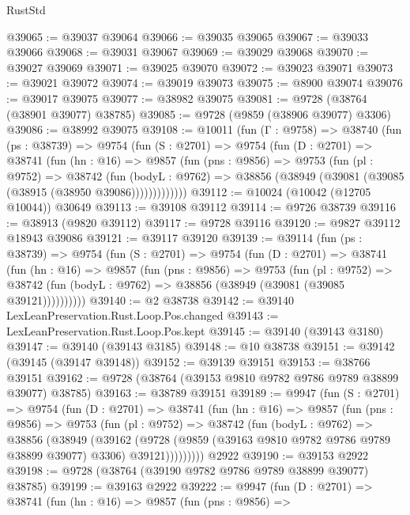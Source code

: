 \begin{lexlean}{RustStd}
\begin{coremodule}
@39065 := @39037 @39064
@39066 := @39035 @39065
@39067 := @39033 @39066
@39068 := @39031 @39067
@39069 := @39029 @39068
@39070 := @39027 @39069
@39071 := @39025 @39070
@39072 := @39023 @39071
@39073 := @39021 @39072
@39074 := @39019 @39073
@39075 := @8900 @39074
@39076 := @39017 @39075
@39077 := @38982 @39075
@39081 := @9728 (@38764 (@38901 @39077) @38785)
@39085 := @9728 (@9859 (@38906 @39077) @3306)
@39086 := @38992 @39075
@39108 := @10011
    (fun (Γ : @9758) =>
    @38740
      (fun (ps : @38739) =>
      @9754
        (fun (S : @2701) =>
        @9754
          (fun (D : @2701) =>
          @38741
            (fun (hn : @16) =>
            @9857
              (fun (pns : @9856) =>
              @9753
                (fun (pl : @9752) =>
                @38742
                  (fun (bodyL : @9762) =>
                  @38856 (@38949 (@39081 (@39085 (@38915 (@38950 @39086)))))))))))))
@39112 := @10024 (@10042 (@12705 @10044)) @30649
@39113 := @39108 @39112
@39114 := @9726 @38739
@39116 := @38913 (@9820 @39112)
@39117 := @9728 @39116
@39120 := @9827 @39112 @18943 @39086
@39121 := @39117 @39120
@39139 := @39114
    (fun (ps : @38739) =>
    @9754
      (fun (S : @2701) =>
      @9754
        (fun (D : @2701) =>
        @38741
          (fun (hn : @16) =>
          @9857
            (fun (pns : @9856) =>
            @9753
              (fun (pl : @9752) =>
              @38742 (fun (bodyL : @9762) => @38856 (@38949 (@39081 (@39085 @39121))))))))))
@39140 := @2 @38738
@39142 := @39140 LexLeanPreservation.Rust.Loop.Pos.changed
@39143 := LexLeanPreservation.Rust.Loop.Pos.kept
@39145 := @39140 (@39143 @3180)
@39147 := @39140 (@39143 @3185)
@39148 := @10 @38738
@39151 := @39142 (@39145 (@39147 @39148))
@39152 := @39139 @39151
@39153 := @38766 @39151
@39162 := @9728 (@38764 (@39153 @9810 @9782 @9786 @9789 @38899 @39077) @38785)
@39163 := @38789 @39151
@39189 := @9947
    (fun (S : @2701) =>
    @9754
      (fun (D : @2701) =>
      @38741
        (fun (hn : @16) =>
        @9857
          (fun (pns : @9856) =>
          @9753
            (fun (pl : @9752) =>
            @38742
              (fun (bodyL : @9762) =>
              @38856
                (@38949
                  (@39162
                    (@9728
                      (@9859 (@39163 @9810 @9782 @9786 @9789 @38899 @39077) @3306)
                      @39121)))))))))
    @2922
@39190 := @39153 @2922
@39198 := @9728 (@38764 (@39190 @9782 @9786 @9789 @38899 @39077) @38785)
@39199 := @39163 @2922
@39222 := @9947
    (fun (D : @2701) =>
    @38741
      (fun (hn : @16) =>
      @9857
        (fun (pns : @9856) =>

\end{coremodule}
\end{lexlean}
